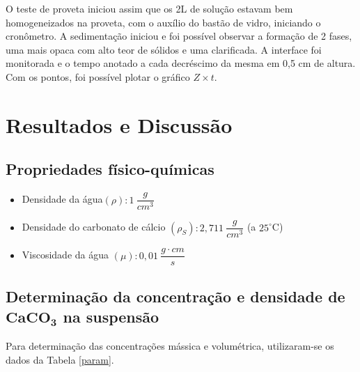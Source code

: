 O teste de proveta iniciou assim que os 2L de solução estavam bem homogeneizados na proveta, com o auxílio do bastão de vidro, iniciando o cronômetro. A sedimentação iniciou e foi possível observar a formação de 2 fases, uma mais opaca com alto teor de sólidos e uma clarificada. A interface foi monitorada e o tempo anotado a cada decréscimo da mesma em 0,5 cm de altura. Com os pontos, foi possível plotar o gráfico $ Z \times t $.




\chapter{Resultados e Discussão}

\section{Propriedades físico-químicas}

\begin{itemize}
\item Densidade da água$ (\rho): 1 \ \dfrac{g}{cm^{3}} $
\item Densidade do carbonato de cálcio $ (\rho _{S}): 2,711 \ \dfrac{g}{cm^{3}} $ (a $ 25^{\circ} $C)
\item Viscosidade da água $ (\mu): 0,01 \ \dfrac{g \cdot cm}{s}$ 
\end{itemize}




\section{Determinação da concentração e densidade de $ \mathbf{CaCO_{3}} $ na suspensão}


Para determinação das concentrações mássica e volumétrica, utilizaram-se os dados da Tabela \ref{param}.


